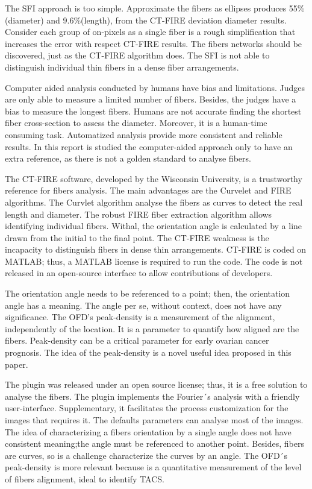\documentclass[12pt,a4paper]{article}
\begin{document}
The SFI approach is too simple. Approximate the fibers as ellipses produces 55\% (diameter) and 9.6\%(length), from the CT-FIRE deviation diameter results. Consider each group of on-pixels as a single fiber is a rough simplification that increases the error with respect CT-FIRE results. The fibers networks should be discovered, just as the CT-FIRE algorithm does. The SFI is not able to distinguish individual thin fibers in a dense fiber arrangements. 

Computer aided analysis conducted by humans have bias and limitations. Judges are only able to measure a limited number of fibers. Besides, the judges have a bias to measure the longest fibers. Humans are not accurate finding the shortest fiber cross-section to assess the diameter. Moreover, it is a human-time consuming task. Automatized analysis provide more consistent and reliable results. In this report is studied the computer-aided approach only to have an extra reference, as there is not a golden standard to analyse fibers. 

The CT-FIRE software, developed by the Wisconsin University, is a trustworthy reference for fibers analysis. The main advantages are the Curvelet and FIRE algorithms. The Curvlet algorithm analyse the fibers as curves to detect the real length and diameter. The robust FIRE fiber extraction algorithm allows identifying individual fibers. Withal, the orientation angle is calculated by a line drawn from the initial to the final point. The CT-FIRE weakness is the incapacity to distinguish fibers in dense thin arrangements. CT-FIRE is coded on MATLAB; thus, a MATLAB license is required to run the code. The code is not released in an open-source interface to allow contributions of developers.  

The orientation angle needs to be referenced to a point; then, the orientation angle has a meaning. The angle per se, without context, does not have any significance. The OFD's peak-density is a measurement of the alignment, independently of the location. It is a parameter to quantify how aligned are the fibers. Peak-density can be a critical parameter for early ovarian cancer prognosis. The idea of the peak-density is a novel useful idea proposed in this paper. 

The plugin was released under an open source license; thus, it is a free solution to analyse the fibers. The plugin implements the Fourier´s analysis with a friendly user-interface. Supplementary, it facilitates the process customization for the images that requires it. The defaults parameters can analyse most of the images. The idea of characterizing a fibers orientation by a single angle does not have consistent meaning;the angle must be referenced to another point. Besides, fibers are curves, so is a challenge characterize the curves by an angle. The OFD´s peak-density is more relevant because is a quantitative measurement of the level of fibers alignment, ideal to identify TACS.
\end{document}
